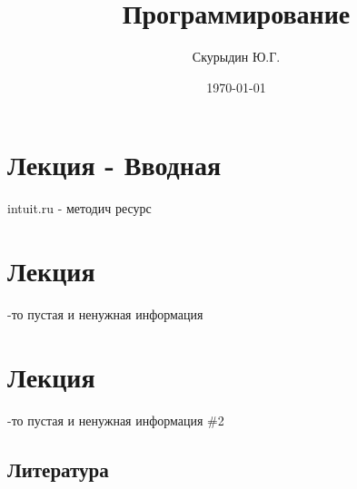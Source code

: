 \documentclass[a4paper, 12pt]{article}
\title{Программирование}
\author{Скурыдин Ю.Г.}
\date{\today}
\begin{document}
\sffamily
\maketitle
\section{Лекция - Вводная}
intuit.ru - методич ресурс\\

\section{Лекция }

{-то пустая и ненужная информация}

\section{Лекция}

{-то пустая и ненужная информация \#2}









\newpage
\subsection*{Литература}
 
\end{document}
